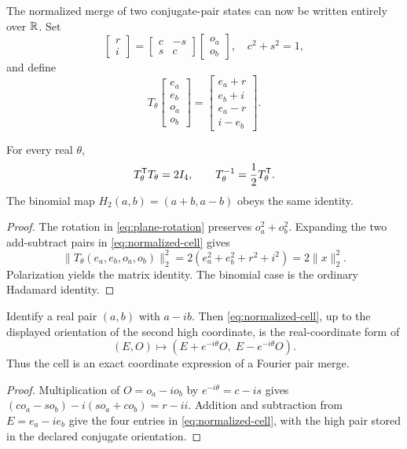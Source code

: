 The normalized merge of two conjugate-pair states can now be written entirely
over $\mathbb{R}$.  Set
\begin{equation}
 \begin{bmatrix}r\\ i\end{bmatrix}
 =
 \begin{bmatrix}c&-s\\s&c\end{bmatrix}
 \begin{bmatrix}o_a\\o_b\end{bmatrix},
 \quad c^2+s^2=1,
 \label{eq:plane-rotation}
\end{equation}
and define
\begin{equation}
 T_\theta
 \begin{bmatrix}e_a\\e_b\\o_a\\o_b\end{bmatrix}
 =
 \begin{bmatrix}e_a+r\\e_b+i\\e_a-r\\i-e_b\end{bmatrix}.
 \label{eq:normalized-cell}
\end{equation}

\begin{theorem}
For every real $\theta$,
\begin{equation}
 T_\theta^{\mathsf{T}}T_\theta=2I_4,
 \qquad
 T_\theta^{-1}={1\over2}T_\theta^{\mathsf{T}}.
 \label{eq:cell-orthogonality}
\end{equation}
The binomial map $H_2(a,b)=(a+b,a-b)$ obeys the same identity.
\end{theorem}
\begin{proof}
The rotation in \eqref{eq:plane-rotation} preserves
$o_a^2+o_b^2$.  Expanding the two add-subtract pairs in
\eqref{eq:normalized-cell} gives
\[
 \|T_\theta(e_a,e_b,o_a,o_b)\|_2^2
 =2(e_a^2+e_b^2+r^2+i^2)=2\|x\|_2^2.
\]
Polarization yields the matrix identity.  The binomial case is the ordinary
Hadamard identity.
\end{proof}

\begin{proposition}
Identify a real pair $(a,b)$ with $a-ib$.  Then
\eqref{eq:normalized-cell}, up to the displayed orientation of the second high
coordinate, is the real-coordinate form of
\begin{equation}
 (E,O)\longmapsto(E+e^{-i\theta}O,\;E-e^{-i\theta}O).
 \label{eq:complex-pair-merge}
\end{equation}
Thus the cell is an exact coordinate expression of a Fourier pair merge.
\end{proposition}
\begin{proof}
Multiplication of $O=o_a-io_b$ by $e^{-i\theta}=c-is$ gives
$(co_a-so_b)-i(so_a+co_b)=r-ii$.  Addition and subtraction from
$E=e_a-ie_b$ give the four entries in
\eqref{eq:normalized-cell}, with the high pair stored in the declared
conjugate orientation.
\end{proof}

